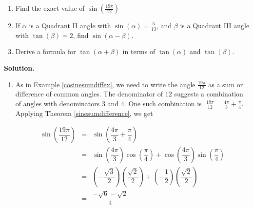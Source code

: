 \begin{ex} $~$  \label{sinesumanddiffex}

\begin{enumerate}

\item  Find the exact value of $\sin\left(\frac{19 \pi}{12}\right)$

\item  If $\alpha$ is a Quadrant II angle with $\sin(\alpha) = \frac{5}{13}$, and $\beta$ is a Quadrant III angle with $\tan(\beta) = 2$, find $\sin(\alpha - \beta)$.

\item  Derive a formula for $\tan(\alpha + \beta)$ in terms of $\tan(\alpha)$ and $\tan(\beta)$.

\end{enumerate}

{\bf Solution.}  

\begin{enumerate}

\item  As in  Example \ref{cosinesumdiffex}, we need to write the angle $\frac{19 \pi}{12}$ as a sum or difference of common angles.  The denominator of $12$ suggests a combination of angles with denominators $3$ and $4$.  One such combination is $\; \frac{19 \pi}{12} = \frac{4 \pi}{3} + \frac{\pi}{4}$.  Applying Theorem \ref{sinesumdifference}, we get

\vspace{-.15in}

\[ \begin{array}{rcl}

\sin\left(\dfrac{19 \pi}{12}\right) & = & \sin\left(\dfrac{4 \pi}{3} + \dfrac{\pi}{4} \right) \\ [10pt]
                            & = & \sin\left(\dfrac{4 \pi}{3} \right)\cos\left(\dfrac{\pi}{4} \right) + \cos\left(\dfrac{4 \pi}{3} \right)\sin\left(\dfrac{\pi}{4} \right) \\ [10pt]
                            & = & \left( -\dfrac{\sqrt{3}}{2} \right)\left( \dfrac{\sqrt{2}}{2} \right)  +  \left( -\dfrac{1}{2} \right)\left( \dfrac{\sqrt{2}}{2} \right) \\ [15pt]
														& = &  \dfrac{-\sqrt{6}- \sqrt{2}}{4} \\
\end{array} \]

\vspace{-.1in}


\end{enumerate}
\end{ex}
